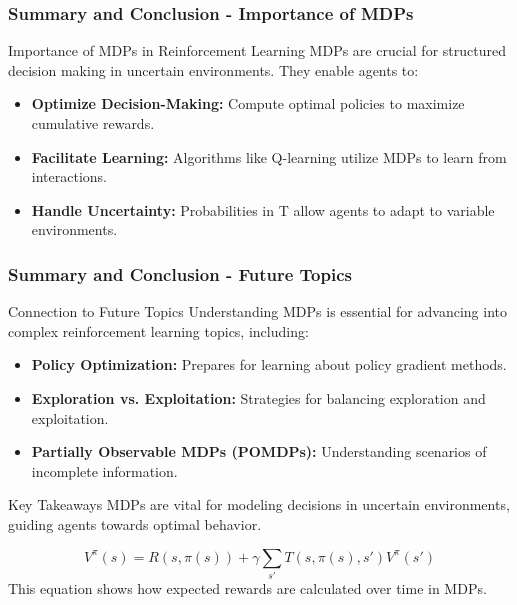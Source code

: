 \documentclass[aspectratio=169]{beamer}
\begin{document}
\begin{frame}[fragile]
    \frametitle{Summary and Conclusion - Importance of MDPs}
    \begin{block}{Importance of MDPs in Reinforcement Learning}
        MDPs are crucial for structured decision making in uncertain environments. They enable agents to:
    \end{block}
    \begin{itemize}
        \item \textbf{Optimize Decision-Making:} Compute optimal policies to maximize cumulative rewards.
        \item \textbf{Facilitate Learning:} Algorithms like Q-learning utilize MDPs to learn from interactions.
        \item \textbf{Handle Uncertainty:} Probabilities in T allow agents to adapt to variable environments.
    \end{itemize}
\end{frame}

\begin{frame}[fragile]
    \frametitle{Summary and Conclusion - Future Topics}
    \begin{block}{Connection to Future Topics}
        Understanding MDPs is essential for advancing into complex reinforcement learning topics, including:
    \end{block}
    \begin{itemize}
        \item \textbf{Policy Optimization:} Prepares for learning about policy gradient methods.
        \item \textbf{Exploration vs. Exploitation:} Strategies for balancing exploration and exploitation.
        \item \textbf{Partially Observable MDPs (POMDPs):} Understanding scenarios of incomplete information.
    \end{itemize}
    
    \begin{block}{Key Takeaways}
        MDPs are vital for modeling decisions in uncertain environments, guiding agents towards optimal behavior.
    \end{block}
    
    \begin{equation}
        V^{\pi}(s) = R(s, \pi(s)) + \gamma \sum_{s'} T(s, \pi(s), s') V^{\pi}(s')
    \end{equation}
    This equation shows how expected rewards are calculated over time in MDPs.
\end{frame}
\end{document}
